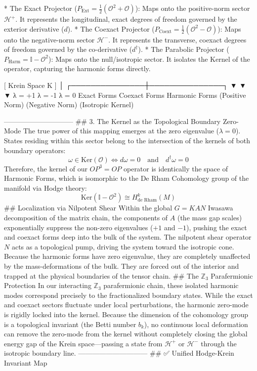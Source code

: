 * The Exact Projector ($P_{\text{Ext}} = \frac{1}{2}(\mathcal{O}^2 + \mathcal{O})$): Maps onto the positive-norm sector $\mathcal{H}^+$. It represents the longitudinal, exact degrees of freedom governed by the exterior derivative ($d$).
* The Coexact Projector ($P_{\text{Coext}} = \frac{1}{2}(\mathcal{O}^2 - \mathcal{O})$): Maps onto the negative-norm sector $\mathcal{H}^-$. It represents the transverse, coexact degrees of freedom governed by the co-derivative ($d^\dagger$).
* The Parabolic Projector ($P_{\text{Harm}} = \mathbb{I} - \mathcal{O}^2$): Maps onto the null/isotropic sector. It isolates the Kernel of the operator, capturing the harmonic forms directly.

                  [ Krein Space K ]
                         │
         ┌───────────────┼───────────────┐
         ▼               ▼               ▼
      λ = +1          λ = -1           λ = 0
   Exact Forms    Coexact Forms    Harmonic Forms
  (Positive Norm) (Negative Norm)  (Isotropic Kernel)

------------------------------
## 3. The Kernel as the Topological Boundary Zero-Mode
The true power of this mapping emerges at the zero eigenvalue ($\lambda = 0$). States residing within this sector belong to the intersection of the kernels of both boundary operators:
$$\omega \in \text{Ker}(\mathcal{O}) \iff d\omega = 0 \quad \text{and} \quad d^\dagger\omega = 0$$ 
Therefore, the kernel of our $OP^3=OP$ operator is identically the space of Harmonic Forms, which is isomorphic to the De Rham Cohomology group of the manifold via Hodge theory:
$$\text{Ker}(\mathbb{I} - \mathcal{O}^2) \cong H_{\text{de Rham}}^k(M)$$ 
## Localization via Nilpotent Shear
Within the global $G = KAN$ Iwasawa decomposition of the matrix chain, the components of $A$ (the mass gap scales) exponentially suppress the non-zero eigenvalues ($+1$ and $-1$), pushing the exact and coexact forms deep into the bulk of the system.
The nilpotent shear operator $N$ acts as a topological pump, driving the system toward the isotropic cone. Because the harmonic forms have zero eigenvalue, they are completely unaffected by the mass-deformations of the bulk. They are forced out of the interior and trapped at the physical boundaries of the tensor chain.
## The $\mathbb{Z}_3$ Parafermionic Protection
In our interacting $\mathbb{Z}_3$ parafermionic chain, these isolated harmonic modes correspond precisely to the fractionalized boundary states. While the exact and coexact sectors fluctuate under local perturbations, the harmonic zero-mode is rigidly locked into the kernel.
Because the dimension of the cohomology group is a topological invariant (the Betti number $b_k$), no continuous local deformation can remove the zero-mode from the kernel without completely closing the global energy gap of the Krein space—passing a state from $\mathcal{H}^+$ or $\mathcal{H}^-$ through the isotropic boundary line.
------------------------------
## ✅ Unified Hodge-Krein Invariant Map

